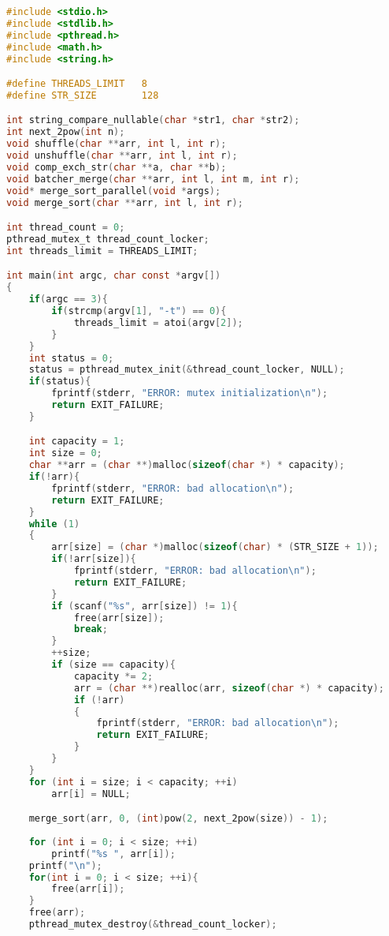 \documentclass[12pt]{article}
\begin{document}
\begin{lstlisting}[language=C, basicstyle=\scriptsize]
#include <stdio.h>
#include <stdlib.h>
#include <pthread.h>
#include <math.h>
#include <string.h>

#define THREADS_LIMIT   8
#define STR_SIZE        128

int string_compare_nullable(char *str1, char *str2);    
int next_2pow(int n);                                   
void shuffle(char **arr, int l, int r);                 
void unshuffle(char **arr, int l, int r);               
void comp_exch_str(char **a, char **b);                 
void batcher_merge(char **arr, int l, int m, int r);    
void* merge_sort_parallel(void *args);                  
void merge_sort(char **arr, int l, int r);              

int thread_count = 0;
pthread_mutex_t thread_count_locker;
int threads_limit = THREADS_LIMIT;

int main(int argc, char const *argv[])
{
    if(argc == 3){
        if(strcmp(argv[1], "-t") == 0){
            threads_limit = atoi(argv[2]);
        }
    }
    int status = 0;
    status = pthread_mutex_init(&thread_count_locker, NULL);
    if(status){
        fprintf(stderr, "ERROR: mutex initialization\n");
        return EXIT_FAILURE;
    }

    int capacity = 1;
    int size = 0;
    char **arr = (char **)malloc(sizeof(char *) * capacity);
    if(!arr){
        fprintf(stderr, "ERROR: bad allocation\n");
        return EXIT_FAILURE;
    }
    while (1)
    {
        arr[size] = (char *)malloc(sizeof(char) * (STR_SIZE + 1));
        if(!arr[size]){
            fprintf(stderr, "ERROR: bad allocation\n");
            return EXIT_FAILURE;
        }
        if (scanf("%s", arr[size]) != 1){
            free(arr[size]);
            break;
        }
        ++size;
        if (size == capacity){
            capacity *= 2;
            arr = (char **)realloc(arr, sizeof(char *) * capacity);
            if (!arr)
            {
                fprintf(stderr, "ERROR: bad allocation\n");
                return EXIT_FAILURE;
            }
        }
    }
    for (int i = size; i < capacity; ++i)
        arr[i] = NULL;

    merge_sort(arr, 0, (int)pow(2, next_2pow(size)) - 1);
    
    for (int i = 0; i < size; ++i)
        printf("%s ", arr[i]);
    printf("\n");
    for(int i = 0; i < size; ++i){
        free(arr[i]);
    }
    free(arr);
    pthread_mutex_destroy(&thread_count_locker);


\end{lstlisting}
\end{document}
